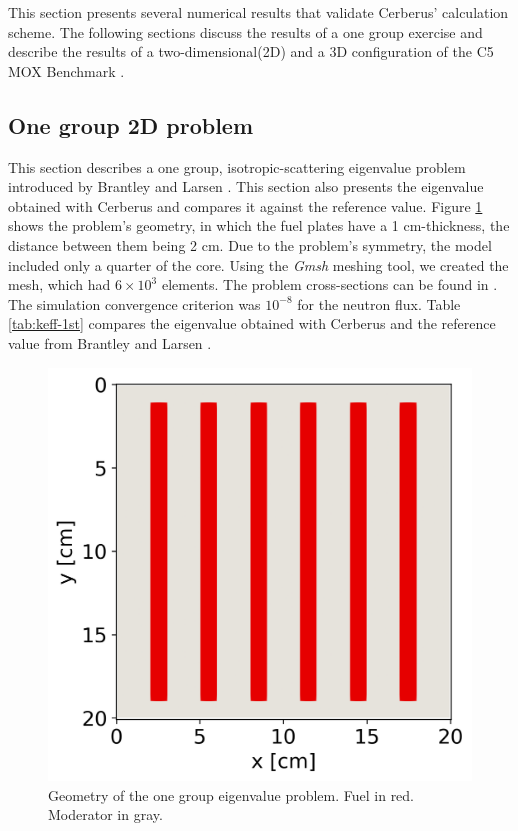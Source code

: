 \documentclass{anstrans}
\begin{document}
This section presents several numerical results that validate Cerberus' calculation scheme.
The following sections discuss the results of a one group exercise and describe the results of a two-dimensional(2D) and a 3D configuration of the C5 MOX Benchmark \cite{cavarec_benchmark_1994}.

\subsection{One group 2D problem}

This section describes a one group, isotropic-scattering eigenvalue problem introduced by Brantley and Larsen \cite{brantley_simplifiedP3_2000}.
This section also presents the eigenvalue obtained with Cerberus and compares it against the reference value.
Figure \ref{fig:2D} shows the problem's geometry, in which the fuel plates have a 1 cm-thickness, the distance between them being 2 cm.
Due to the problem's symmetry, the model included only a quarter of the core.
Using the \textit{Gmsh} \cite{geuzaine_gmsh_2009} meshing tool, we created the mesh, which had $6 \times 10^{3}$ elements.
The problem cross-sections can be found in \cite{brantley_simplifiedP3_2000}.
The simulation convergence criterion was $10^{-8}$ for the neutron flux.
Table \ref{tab:keff-1st} compares the eigenvalue obtained with Cerberus and the reference value from Brantley and Larsen \cite{brantley_simplifiedP3_2000}.

\begin{figure}[htbp!] %
    \centering
    \includegraphics[width=0.55\linewidth]{figures/mesh2.png}
    \hfill
    \caption{Geometry of the one group eigenvalue problem. Fuel in red. Moderator in gray.}
    \label{fig:2D}
\end{figure}
\end{document}
